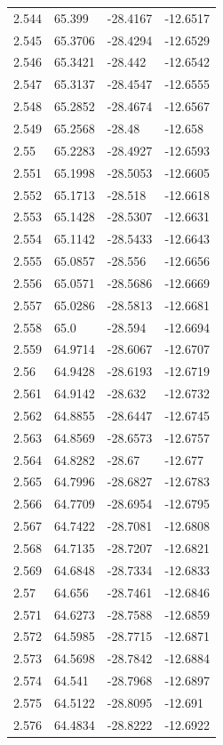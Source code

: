 \begin{tabular}{llll}
2.544 & 65.399 & -28.4167 & -12.6517 \\
2.545 & 65.3706 & -28.4294 & -12.6529 \\
2.546 & 65.3421 & -28.442 & -12.6542 \\
2.547 & 65.3137 & -28.4547 & -12.6555 \\
2.548 & 65.2852 & -28.4674 & -12.6567 \\
2.549 & 65.2568 & -28.48 & -12.658 \\
2.55 & 65.2283 & -28.4927 & -12.6593 \\
2.551 & 65.1998 & -28.5053 & -12.6605 \\
2.552 & 65.1713 & -28.518 & -12.6618 \\
2.553 & 65.1428 & -28.5307 & -12.6631 \\
2.554 & 65.1142 & -28.5433 & -12.6643 \\
2.555 & 65.0857 & -28.556 & -12.6656 \\
2.556 & 65.0571 & -28.5686 & -12.6669 \\
2.557 & 65.0286 & -28.5813 & -12.6681 \\
2.558 & 65.0 & -28.594 & -12.6694 \\
2.559 & 64.9714 & -28.6067 & -12.6707 \\
2.56 & 64.9428 & -28.6193 & -12.6719 \\
2.561 & 64.9142 & -28.632 & -12.6732 \\
2.562 & 64.8855 & -28.6447 & -12.6745 \\
2.563 & 64.8569 & -28.6573 & -12.6757 \\
2.564 & 64.8282 & -28.67 & -12.677 \\
2.565 & 64.7996 & -28.6827 & -12.6783 \\
2.566 & 64.7709 & -28.6954 & -12.6795 \\
2.567 & 64.7422 & -28.7081 & -12.6808 \\
2.568 & 64.7135 & -28.7207 & -12.6821 \\
2.569 & 64.6848 & -28.7334 & -12.6833 \\
2.57 & 64.656 & -28.7461 & -12.6846 \\
2.571 & 64.6273 & -28.7588 & -12.6859 \\
2.572 & 64.5985 & -28.7715 & -12.6871 \\
2.573 & 64.5698 & -28.7842 & -12.6884 \\
2.574 & 64.541 & -28.7968 & -12.6897 \\
2.575 & 64.5122 & -28.8095 & -12.691 \\
2.576 & 64.4834 & -28.8222 & -12.6922 \\

\end{tabular}
